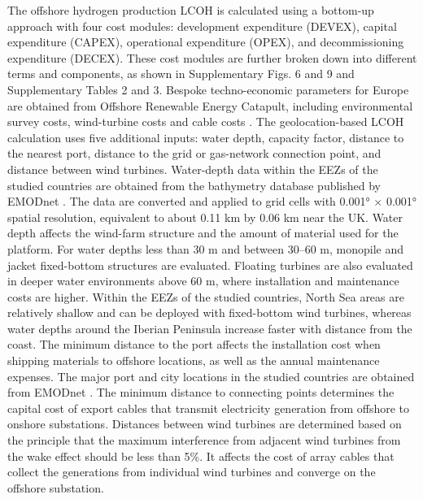 \documentclass[pdflatex,lineno,sn-mathphys,Numbered]{sn-jnl}%
\begin{document}
The offshore hydrogen production LCOH is calculated using a bottom-up approach with four cost modules: development expenditure (DEVEX), capital expenditure (CAPEX), operational expenditure (OPEX), and decommissioning expenditure (DECEX). These cost modules are further broken down into different terms and components, as shown in Supplementary Figs. 6 and 9 and Supplementary Tables 2 and 3. Bespoke techno-economic parameters for Europe are obtained from Offshore Renewable Energy Catapult, including environmental survey costs, wind-turbine costs and cable costs \cite{OffshoreWindandHydrogen}.
The geolocation-based LCOH calculation uses five additional inputs: water depth, capacity factor, distance to the nearest port, distance to the grid or gas-network connection point, and distance between wind turbines.
Water-depth data within the EEZs of the studied countries are obtained from the bathymetry database published by EMODnet \cite{bathymetry_2022}. The data are converted and applied to grid cells with 0.001° $\times$ 0.001° spatial resolution, equivalent to about 0.11 km by 0.06 km near the UK.
Water depth affects the wind-farm structure and the amount of material used for the platform. For water depths less than 30 m and between 30--60 m, monopile and jacket fixed-bottom structures are evaluated. Floating turbines are also evaluated in deeper water environments above 60 m, where installation and maintenance costs are higher. Within the EEZs of the studied countries, North Sea areas are relatively shallow and can be deployed with fixed-bottom wind turbines, whereas water depths around the Iberian Peninsula increase faster with distance from the coast.
The minimum distance to the port affects the installation cost when shipping materials to offshore locations, as well as the annual maintenance expenses. The major port and city locations in the studied countries are obtained from EMODnet \cite{EMODnet}.
The minimum distance to connecting points determines the capital cost of export cables that transmit electricity generation from offshore to onshore substations.
Distances between wind turbines are determined based on the principle that the maximum interference from adjacent wind turbines from the wake effect should be less than 5\%. It affects the cost of array cables that collect the generations from individual wind turbines and converge on the offshore substation.
\end{document}
